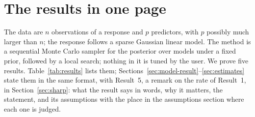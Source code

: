 \section{The results in one page}\label{sec:results}

The data are $n$ observations of a response and $p$ predictors, with $p$ possibly much larger than $n$; the response
follows a sparse Gaussian linear model. The method is a sequential Monte Carlo sampler for the posterior over models
under a fixed prior, followed by a local search; nothing in it is tuned by the user. We prove five results. Table~\ref{tab:results}
lists them; Sections~\ref{sec:model-result}--\ref{sec:estimates} state them in the same format, with Result~5, a remark on
the rate of Result~1, in Section~\ref{sec:sharp}: what
the result says in words, why it matters, the statement, and its assumptions with the place in the assumptions section where each one is judged.

